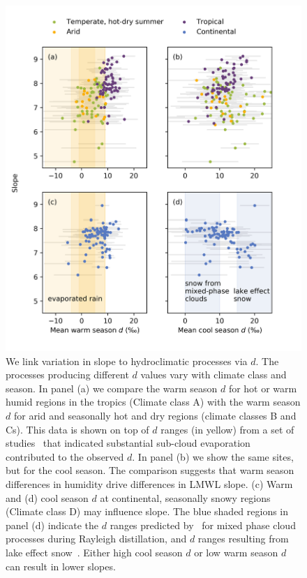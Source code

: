 \documentclass[draft, linenumbers]{agujournal2018}
\begin{document}
\begin{figure}
  \centering
  \includegraphics[width=6in]{Figs/Fig4.png}
  \caption{We link variation in slope to hydroclimatic processes via $d$. The processes producing different $d$ values vary with climate class and season. In panel (a) we compare the warm season $d$ for hot or warm humid regions in the tropics (Climate class A) with the warm season $d$ for arid and seasonally hot and dry regions (climate classes B and Cs). This data is shown on top of $d$ ranges (in yellow) from a set of studies~\citep{Chen2015, Wang2016, Graf2019} that indicated substantial sub-cloud evaporation contributed to the observed $d$. In panel (b) we show the same sites, but for the cool season. The comparison suggests that warm season differences in humidity drive differences in LMWL slope. (c) Warm and (d) cool season $d$ at continental, seasonally snowy regions (Climate class D) may influence slope. The blue shaded regions in panel (d) indicate the $d$ ranges predicted by~\citet{Ciais1994} for mixed phase cloud processes during Rayleigh distillation, and $d$ ranges resulting from lake effect snow~\citep{Corcoran2019}. Either high cool season $d$ or low warm season $d$ can result in lower slopes. }
  \label{fig:seasonaldex}
\end{figure}
\end{document}
